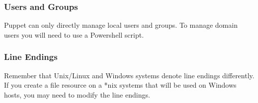 \documentclass[10pt]{beamer}
\begin{document}
\begin{frame}
  \frametitle{Users and Groups}
  Puppet can only directly manage local users and groups.  To manage domain users you will 
  need to use a Powershell script.

\end{frame}
\begin{frame}
  \frametitle{Line Endings}

  Remember that Unix/Linux and Windows systems denote line endings differently.  If you 
  create a file resource on a *nix systems that will be used on Windows hosts, you may need 
  to modify the line endings.

\end{frame}
\end{document}
